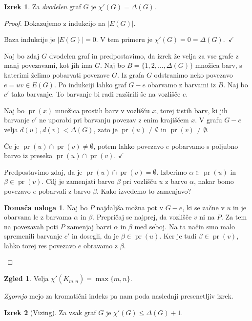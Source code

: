 \documentclass[11pt]{book}
\DeclareMathOperator\pr{pr}
\def\kljuka{$\checkmark$}
\theoremstyle{definition}
\theoremstyle{zgled}
\newtheorem*{zgled}{Zgled}
\theoremstyle{odprtproblem}
\theoremstyle{domacanaloga}
\newtheorem*{domacanaloga}{Domača naloga}
\newenvironment{dokaz}
    {\color{siva}\begin{proof}}
    {\end{proof}}
\theoremstyle{izrek}
\newtheorem*{izrek}{Izrek}
\begin{document}
\begin{izrek}
Za \emph{dvodelen} graf $G$ je $\chi'(G) = \Delta(G)$.
\end{izrek}
\begin{dokaz}
Dokazujemo z indukcijo na $|E(G)|$.

Baza indukcije je $|E(G)| = 0$. V tem primeru je $\chi'(G) = 0 = \Delta(G)$. \kljuka

Naj bo zdaj $G$ dvodelen graf in predpostavimo, da izrek že velja za vse grafe z manj povezavami, kot jih ima $G$. Naj bo $B = \{ 1,2,\dots, \Delta(G)\}$ množica barv, s katerimi želimo pobarvati povezave $G$. Iz grafa $G$ odstranimo neko povezavo $e = uv \in E(G)$. Po indukciji lahko graf $G-e$ obarvamo z barvami iz $B$. Naj bo $c'$ tako barvanje. To barvanje bi radi razširili še na vozlišče $e$. 

Naj bo $\pr(x)$ množica prostih barv v vozlišču $x$, torej tistih barv, ki jih barvanje $c'$ ne uporabi pri barvanju povezav z enim krajiščem $x$. V grafu $G - e$ velja $d(u), d(v) < \Delta(G)$, zato je $\pr(u) \neq \emptyset$ in $\pr(v) \neq \emptyset$. 

Če je $\pr(u) \cap \pr(v) \neq \emptyset$, potem lahko povezavo $e$ pobarvamo s poljubno barvo iz preseka $\pr(u) \cap \pr(v)$. \kljuka

Predpostavimo zdaj, da je $\pr(u) \cap \pr(v) = \emptyset$. Izberimo $\alpha \in \pr(u)$ in $\beta \in \pr(v)$. Cilj je zamenjati barvo $\beta$ pri vozlišču $u$ z barvo $\alpha$, nakar bomo povezavo $e$ pobarvali z barvo $\beta$. Kako izvedemo to zamenjavo?

\begin{domacanaloga}
Naj bo $P$ najdaljša možna pot v $G - e$, ki se začne v $u$ in je obarvana le z barvama $\alpha$ in $\beta$. Prepričaj se najprej, da vozlišče $v$ ni na $P$. Za tem na povezavah poti $P$ zamenjaj barvi $\alpha$ in $\beta$ med seboj. Na ta način smo malo spremenili barvanje $c'$ in dosegli, da je $\beta \in \pr(u)$. Ker je tudi $\beta \in \pr(v)$, lahko torej res povezavo $e$ obravamo z $\beta$.
\end{domacanaloga}
\end{dokaz}

\begin{zgled}
Velja $\chi'(K_{m,n}) = \max \{ m, n \}$.
\end{zgled}

\emph{Zgornjo} mejo za kromatični indeks pa nam poda naslednji presenetljiv izrek.

\begin{izrek}[Vizing]
Za vsak graf $G$ je $\chi'(G) \leq \Delta(G) + 1$.
\end{izrek}
\end{document}
